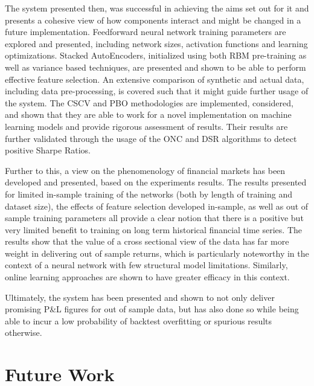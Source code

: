 \documentclass[a4paper,11pt,oneside]{article}
\theoremstyle{plain}
\theoremstyle{definition}
\begin{document}
	The system presented then, was successful in achieving the aims set out for it and presents a cohesive view of how components interact and might be changed in a future implementation. Feedforward neural network training parameters are explored and presented, including network sizes, activation functions and learning optimizations. Stacked AutoEncoders, initialized using both RBM pre-training as well as variance based techniques, are presented and shown to be able to perform effective feature selection. An extensive comparison of synthetic and actual data, including data pre-processing, is covered such that it might guide further usage of the system. The CSCV and PBO methodologies are implemented, considered, and shown that they are able to work for a novel implementation on machine learning models and provide rigorous assessment of results. Their results are further validated through the usage of the ONC and DSR algorithms to detect positive Sharpe Ratios. \newline 
	
	Further to this, a view on the phenomenology of financial markets has been developed and presented, based on the experiments results. The results presented for limited in-sample training of the networks (both by length of training and dataset size), the effects of feature selection developed in-sample, as well as out of sample training parameters all provide a clear notion that there is a positive but very limited benefit to training on long term historical financial time series. The results show that the value of a cross sectional view of the data has far more weight in delivering out of sample returns, which is particularly noteworthy in the context of a neural network with few structural model limitations. Similarly, online learning approaches are shown to have greater efficacy in this context. \newline 
	
	Ultimately, the system has been presented and shown to not only deliver promising P\&L figures for out of sample data, but has also done so while being able to incur a low probability of backtest overfitting or spurious results otherwise.
	
	\newpage
	\section{Future Work}
	
\end{document}
